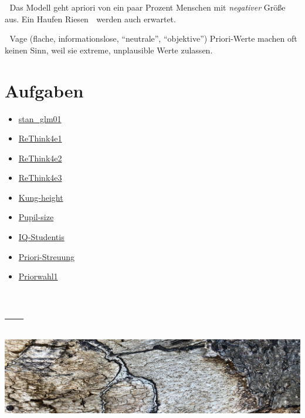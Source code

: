 \documentclass[
  a4paper,
  DIV=11]{scrreprt}
\providecommand{\tightlist}{%
  \setlength{\itemsep}{0pt}\setlength{\parskip}{0pt}}\usepackage{longtable,booktabs,array}
\theoremstyle{definition}
\theoremstyle{remark}
\begin{document}
🤔 Das Modell geht apriori von ein paar Prozent Menschen mit
\emph{negativer} Größe aus. Ein Haufen Riesen 👹 werden auch erwartet.

🤯 Vage (flache, informationslose, ``neutrale'', ``objektive'')
Priori-Werte machen oft keinen Sinn, weil sie extreme, unplausible Werte
zulassen.

\hypertarget{aufgaben-6}{%
\section{Aufgaben}\label{aufgaben-6}}

\begin{itemize}
\tightlist
\item
  \href{https://datenwerk.netlify.app/posts/stan_glm01/stan_glm01.html}{stan\_glm01}
\item
  \href{https://datenwerk.netlify.app/posts/rethink4e1/rethink4e1}{ReThink4e1}
\item
  \href{https://datenwerk.netlify.app/posts/rethink4e2/rethink4e2}{ReThink4e2}
\item
  \href{https://datenwerk.netlify.app/posts/rethink4e3/rethink4e3}{ReThink4e3}
\item
  \href{https://datenwerk.netlify.app/posts/kung-height/kung-height}{Kung-height}
\item
  \href{https://datenwerk.netlify.app/posts/pupil-size/pupil-size}{Pupil-size}
\item
  \href{https://datenwerk.netlify.app/posts/iq-studentis/iq-studentis}{IQ-Studentis}
\item
  \href{https://datenwerk.netlify.app/posts/priori-streuung/priori-streuung}{Priori-Streuung}
\item
  \href{https://datenwerk.netlify.app/posts/priorwahl1/priorwahl1}{Priorwahl1}
\end{itemize}

\hypertarget{section-7}{%
\section{---}\label{section-7}}

\includegraphics[width=1\textwidth,height=\textheight]{./img/outro-08.jpg}
\end{document}
